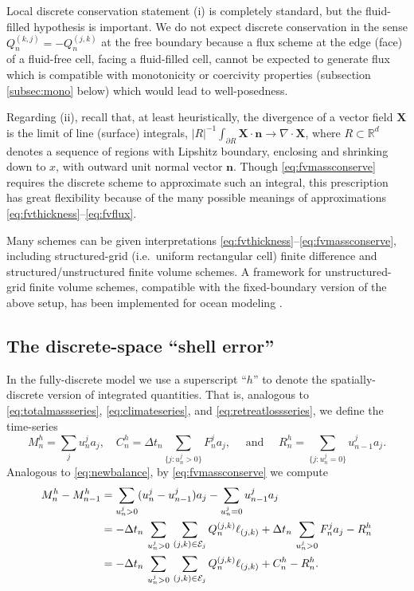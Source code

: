\documentclass[final,leqno,onefignum,onetabnum]{siamltex1213bueler}
\newcommand\bn{\mathbf{n}}
\newcommand\bX{\mathbf{X}}
\newcommand{\Div}{\nabla\cdot}
\newcommand\RR{\mathbb{R}}
\begin{document}
Local discrete conservation statement (i) is completely standard, but the fluid-filled hypothesis is important.  We do not expect discrete conservation in the sense $Q_n^{(k,j)}=-Q_n^{(j,k)}$ at the free boundary because a flux scheme at the edge (face) of a fluid-free cell, facing a fluid-filled cell, cannot be expected to generate flux which is compatible with monotonicity or coercivity properties (subsection \ref{subsec:mono} below) which would lead to well-posedness.

Regarding (ii), recall that, at least heuristically, the divergence of a vector field $\bX$ is the limit of line (surface) integrals, $|R|^{-1} \int_{\partial R} \bX\cdot \bn \to \Div \bX$, where $R\subset \RR^d$ denotes a sequence of regions with Lipshitz boundary, enclosing and shrinking down to $x$, with outward unit normal vector $\bn$.  Though \eqref{eq:fvmassconserve} requires the discrete scheme to approximate such an integral, this prescription has great flexibility because of the many possible meanings of approximations \eqref{eq:fvthickness}--\eqref{eq:fvflux}.

Many schemes can be given interpretations \eqref{eq:fvthickness}--\eqref{eq:fvmassconserve}, including structured-grid (i.e.~uniform rectangular cell) finite difference \cite{Bueler2015,MortonMayers2005} and structured/unstructured finite volume \cite{LeVeque2002} schemes.  A framework for unstructured-grid finite volume schemes, compatible with the fixed-boundary version of the above setup, has been implemented for ocean modeling \cite{Ringleretal2013}.

\subsection{The discrete-space ``shell error''}  \label{subsec:shellerror}  In the fully-discrete model we use a superscript ``$h$'' to denote the spatially-discrete version of integrated quantities.  That is, analogous to \eqref{eq:totalmassseries}, \eqref{eq:climateseries}, and \eqref{eq:retreatlossseries}, we define the time-series
\begin{equation}
  M_n^h = \sum_j u_n^j a_j, \quad C_n^h = \Delta t_n\!\!\sum_{\{j:u_n^j>0\}} F_n^j a_j, \quad \text{ and } \quad R_n^h = \sum_{\{j:u_n^j=0\}} u_{n-1}^j a_j.  \label{eq:fvtimeseriesdefn}
\end{equation}
Analogous to \eqref{eq:newbalance}, by \eqref{eq:fvmassconserve} we compute
\begin{align}
M_n^h - M_{n-1}^h &= \sum_{u_n^j>0} (u_n^j - u_{n-1}^j) a_j - \sum_{u_n^j=0} u_{n-1}^j a_j \notag \\
   &= - \Delta t_n\,\sum_{u_n^j>0}\, \sum_{(j,k)\in\mathcal{E}_j} Q_n^{(j,k)} \ell_{(j,k)} + \Delta t_n\,\sum_{u_n^j>0} F_n^j a_j - R_n^h \notag \\
   &= - \Delta t_n\,\sum_{u_n^j>0}\, \sum_{(j,k)\in\mathcal{E}_j} Q_n^{(j,k)} \ell_{(j,k)} + C_n^h - R_n^h.  \label{eq:fvnewbalance}
\end{align}
\end{document}
